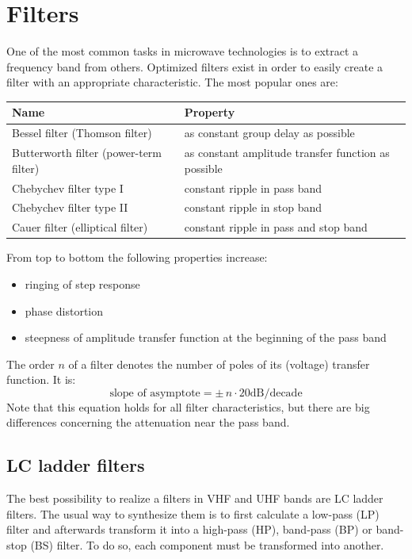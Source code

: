 \section{Filters}

One of the most common tasks in microwave technologies is to
extract a frequency band from others. Optimized filters exist
in order to easily create a filter with an appropriate characteristic.
The most popular ones are:

\addvspace{12pt}

\begin{tabular}{l|l}
Name & Property \\
\hline
Bessel filter (Thomson filter) & as constant group delay as possible \\
Butterworth filter (power-term filter) & as constant amplitude transfer function as possible \\
Chebychev filter type I & constant ripple in pass band \\
Chebychev filter type II & constant ripple in stop band \\
Cauer filter (elliptical filter) & constant ripple in pass and stop band \\
\end{tabular}

\addvspace{12pt}

From top to bottom the following properties increase:
\begin{itemize}
\item ringing of step response
\item phase distortion
\item steepness of amplitude transfer function at the beginning of the pass band
\end{itemize}

\addvspace{12pt}

The order $n$ of a filter denotes the number of poles of its (voltage)
transfer function. It is:
\begin{equation}
\text{slope of asymptote} = \pm\, n\cdot 20 \text{dB/decade}
\end{equation}
Note that this equation holds for all filter characteristics, but
there are big differences concerning the attenuation near the pass
band.


\subsection{LC ladder filters}

The best possibility to realize a filters in VHF and UHF bands are
LC ladder filters. The usual way to synthesize them is to first
calculate a low-pass (LP) filter and afterwards transform it into a
high-pass (HP), band-pass (BP) or band-stop (BS) filter. To do so,
each component must be transformed into another.

